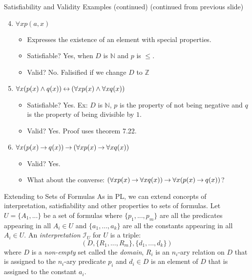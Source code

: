 \documentclass[style=sailor,size=12pt,mode=present]{powerdot}
\theoremstyle{definition}
\newenvironment{defn}[1]
  {\renewcommand\theinnerdefn{#1}\innerdefn}
  {\endinnerdefn}
\newcommand{\bb}[1]{\mathbb{#1}}
\newcommand{\Z}{\bb{Z}}
\newcommand{\N}{\bb{N}}
\begin{document}
\begin{wideslide}[bm=,toc=]{Satisfiability and Validity Examples (continued)}
\begin{defn}{7.25}{Ben Ari}
(continued from previous slide)
\end{defn}
\begin{enumerate}
\setcounter{enumi}{3}
\item<2-> $\forall x p(a,x)$
\begin{itemize}
\item<3-> Expresses the existence of an element with special properties.
\item<3-> Satisfiable? \pause[3] Yes, when $D$ is $\N$ and $p$ is $\leq$.
\item<3-> Valid? \pause No. Falisified if we change $D$ to $\Z$ 
\end{itemize}
\item<6-> $\forall x (p(x) \land q(x)) \mathbin{\leftrightarrow} (\forall x p(x) \land \forall x
    q(x))$
\begin{itemize}
\item<7-> Satisfiable? \pause[3] Yes. Ex: $D$ is $\N$, $p$ is the property of
not being negative and $q$ is the property of being divisible by $1$. 
\item<7-> Valid? \pause Yes. Proof uses theorem 7.22. 
\end{itemize}
\item<10-> $\forall x (p(x) \mathbin{\rightarrow} q(x)) \mathbin{\rightarrow} (\forall x p(x) \mathbin{\rightarrow} \forall x q(x))$
\begin{itemize}
\item<11-> Valid? \pause Yes. 
\item<11-> What about the converse: $(\forall x p(x) \mathbin{\rightarrow} \forall x q(x)) \mathbin{\rightarrow} \forall x (p(x) \mathbin{\rightarrow} q(x))$?
\end{itemize}
\end{enumerate}
\end{wideslide}

\begin{wideslide}[bm=,toc=]{Extending to Sets of Formulas}
As in PL, we can extend concepts of interpretation, satisfiability and other
properties to sets of formulas.
\begin{defn}{7.26}[Ben Ari]
Let $U = \{A_1,...\}$ be a set of formulas where $\{p_1,...,p_m\}$ are all
the predicates appearing in all $A_i \in U$ and $\{a_1,...,a_k\}$ are all the
constants appearing in all $A_i \in U$. An \emph{interpretation} $\mathcal{I}_U$
for $U$ is a triple:
\[(D, \{R_1,...,R_m\},\{d_1,...,d_k\})\]
where $D$ is a \emph{non-empty} set called the \emph{domain}, $R_i$ is an
$n_i$-ary relation on $D$ that is assigned to the $n_i$-ary predicate $p_i$
and $d_i \in D$ is an element of $D$ that is assigned to the constant $a_i$.
\end{defn}

\end{wideslide}
\end{document}
